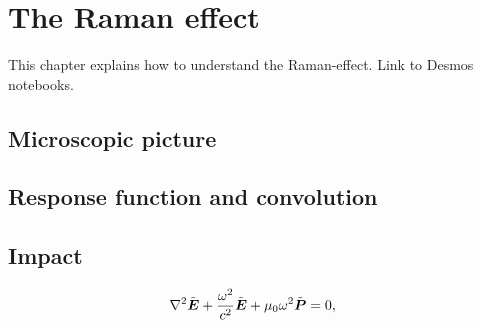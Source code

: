 \chapter{The Raman effect}
\label{ch:Raman}

This chapter explains how to understand the Raman-effect. Link to Desmos notebooks. 

\section{Microscopic picture}

\section{Response function and convolution}

\section{Impact}


\begin{align}
    \nabla^{2}\tilde{\boldsymbol{E}}+\frac{\omega^{2}}{c^{2}}\tilde{\boldsymbol{E}}+\text{\ensuremath{\mu_{0}}}\omega^{2}\tilde{\boldsymbol{P}}&=0,
\end{align}